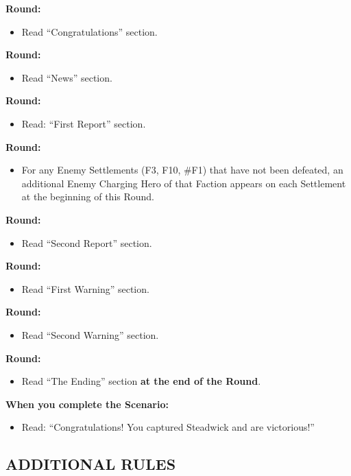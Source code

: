\begin{multicols*}{2}
\textbf{ Round:}
\begin{itemize}
  \item Read ``Congratulations'' section.
\end{itemize}

\textbf{ Round:}
\begin{itemize}
  \item Read ``News'' section.
\end{itemize}

\textbf{ Round:}
\begin{itemize}
  \item Read: ``First Report'' section.
\end{itemize}

\textbf{ Round:}
\begin{itemize}
  \item For any Enemy Settlements (F3, F10, \#F1) that have not been defeated, an additional Enemy
    Charging Hero of that Faction appears on each Settlement at the beginning of this Round.
\end{itemize}

\textbf{ Round:}
\begin{itemize}
  \item Read ``Second Report'' section.
\end{itemize}

\textbf{ Round:}
\begin{itemize}
  \item Read ``First Warning'' section.
\end{itemize}

\textbf{ Round:}
\begin{itemize}
  \item Read ``Second Warning'' section.
\end{itemize}

\textbf{ Round:}
\begin{itemize}
  \item Read ``The Ending'' section \textbf{at the end of the Round}.
\end{itemize}

\textbf{When you complete the Scenario:}
\begin{itemize}
  \item Read: ``Congratulations! You captured Steadwick and are victorious!''
\end{itemize}

\subsection*{\MakeUppercase{Additional Rules}}


\end{multicols*}
